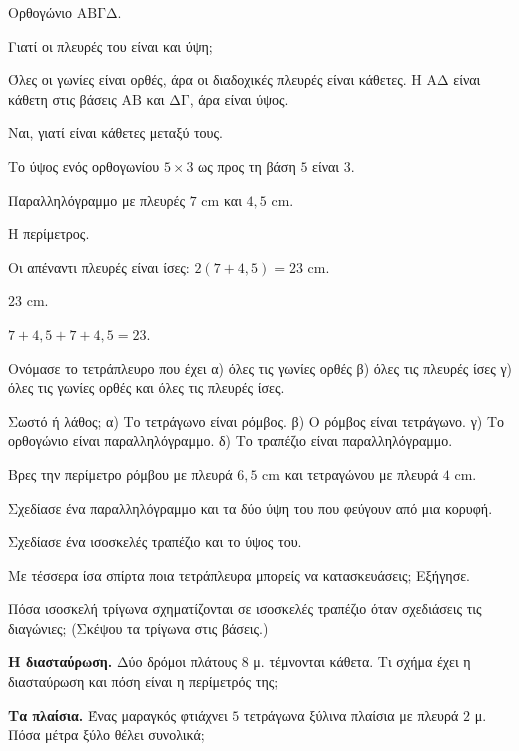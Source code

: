 \tixero Ορθογώνιο $\mathrm{ΑΒΓΔ}$.\par
\tithelo Γιατί οι πλευρές του είναι και ύψη;\par
\possindeo Όλες οι γωνίες είναι ορθές, άρα οι διαδοχικές πλευρές είναι κάθετες. Η $\mathrm{ΑΔ}$ είναι κάθετη στις βάσεις $\mathrm{ΑΒ}$ και $\mathrm{ΔΓ}$, άρα είναι ύψος.\par
\apantisi Ναι, γιατί είναι κάθετες μεταξύ τους.\par
\elegxos Το ύψος ενός ορθογωνίου $5\times3$ ως προς τη βάση $5$ είναι $3$.

\tixero Παραλληλόγραμμο με πλευρές $7$ cm και $4{,}5$ cm.\par
\tithelo Η περίμετρος.\par
\possindeo Οι απέναντι πλευρές είναι ίσες: $2(7+4{,}5)=23$ cm.\par
\apantisi $23$ cm.\par
\elegxos $7+4{,}5+7+4{,}5=23$.



\ex Ονόμασε το τετράπλευρο που έχει α) όλες τις γωνίες ορθές β) όλες τις πλευρές ίσες γ) όλες τις γωνίες ορθές και όλες τις πλευρές ίσες.

\ex Σωστό ή λάθος; α) Το τετράγωνο είναι ρόμβος. \quad β) Ο ρόμβος είναι τετράγωνο. \quad γ) Το ορθογώνιο είναι παραλληλόγραμμο. \quad δ) Το τραπέζιο είναι παραλληλόγραμμο.

\ex Βρες την περίμετρο ρόμβου με πλευρά $6{,}5$ cm και τετραγώνου με πλευρά $4$ cm.

\ex Σχεδίασε ένα παραλληλόγραμμο και τα δύο ύψη του που φεύγουν από μια κορυφή.

\ex Σχεδίασε ένα ισοσκελές τραπέζιο και το ύψος του.

\ex Με τέσσερα ίσα σπίρτα ποια τετράπλευρα μπορείς να κατασκευάσεις; Εξήγησε.

\ex Πόσα ισοσκελή τρίγωνα σχηματίζονται σε ισοσκελές τραπέζιο όταν σχεδιάσεις τις διαγώνιες; (Σκέψου τα τρίγωνα στις βάσεις.)


\ex \textbf{Η διασταύρωση.} Δύο δρόμοι πλάτους $8$ μ. τέμνονται κάθετα. Τι σχήμα έχει η διασταύρωση και πόση είναι η περίμετρός της;

\ex \textbf{Τα πλαίσια.} Ένας μαραγκός φτιάχνει $5$ τετράγωνα ξύλινα πλαίσια με πλευρά $2$ μ. Πόσα μέτρα ξύλο θέλει συνολικά;

